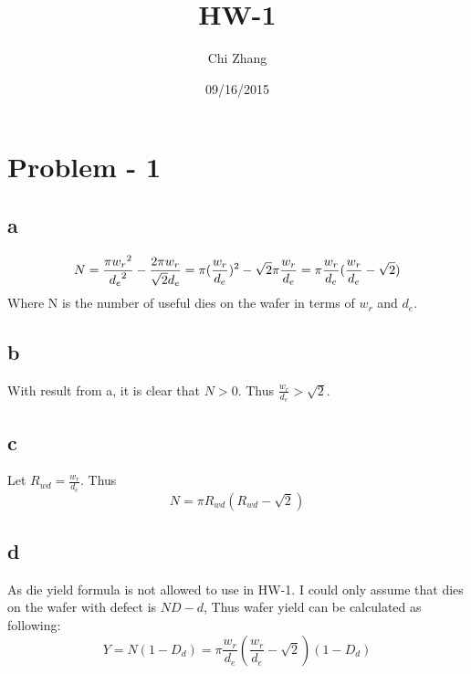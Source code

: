 \documentclass[a4paper,10pt]{article}
\title{HW-1}
\author{Chi Zhang}
\date{09/16/2015}
\begin{document}
\maketitle
\section*{Problem - 1}
\subsection*{a}
\begin{equation}
 N = \frac{\pi {w_r}^2}{{d_e}^2} - \frac{2\pi {w_r}}{\sqrt{2} d_e} = \pi(\frac{w_r}{d_e})^2 - \sqrt{2}\pi\frac{w_r}{d_e}\\
  = \pi\frac{w_r}{d_e} (\frac{w_r}{d_e} - \sqrt{2})
\end{equation}
Where N is the number of useful dies on the wafer in terms of \begin{math}w_r\end{math} and \begin{math}d_e\end{math}.
\subsection*{b}
With result from a, it is clear that \begin{math}N > 0\end{math}. Thus \begin{math}\frac{w_r}{d_e} > \sqrt{2}\end{math}.
\subsection*{c}
Let \begin{math}R_{wd} = \frac{w_r}{d_e}\end{math}. Thus
\begin{equation}
 N = \pi R_{wd} (R_{wd} - \sqrt{2})
\end{equation}
\subsection*{d}
As die yield formula is not allowed to use in HW-1. I could only assume that dies on the wafer with defect is 
\begin{math}ND-d\end{math}, Thus wafer yield can be calculated as following:
\begin{equation}
 Y = N(1 - D_d) = \pi\frac{w_r}{d_e} (\frac{w_r}{d_e} - \sqrt{2})(1 - D_d)
\end{equation}
\end{document}
